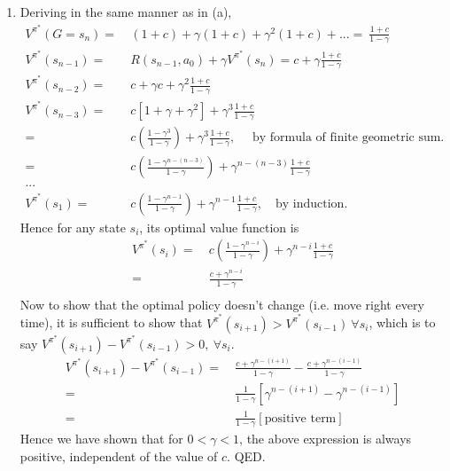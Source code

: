 \documentclass[11pt]{article}
\newcommand{\Vfunc}[2]{\ensuremath{V^{#1}(#2)}}
\begin{document}
\begin{enumerate}[label=(\alph*)]
	
	\item 
	Deriving in the same manner as in (a),
	\begin{align*}
	\Vfunc{\pi^*}{G=s_n}
	=&\ (1+c)+\gamma(1+c)+\gamma^2(1+c)+... =\ \frac{1+c}{1-\gamma} \\ 
	\Vfunc{\pi^*}{s_{n-1}}
	=&\ R(s_{n-1}, a_0) + \gamma \Vfunc{\pi^*}{s_n} = c + \gamma \frac{1+c}{1-\gamma} \\ 
	\Vfunc{\pi^*}{s_{n-2}}
	=&\ c + \gamma c + \gamma^2 \frac{1+c}{1-\gamma} \\
	\Vfunc{\pi^*}{s_{n-3}}
	=&\ c[1+\gamma+\gamma^2] + \gamma^3 \frac{1+c}{1-\gamma} \\
	=&\ c\left(\frac{1-\gamma^3}{1-\gamma}\right) + \gamma^3 \frac{1+c}{1-\gamma} , \quad \textrm{ by formula of finite geometric sum.} \\
	=&\ c\left(\frac{1-\gamma^{n-(n-3)}}{1-\gamma}\right) + \gamma^{n-(n-3)} \frac{1+c}{1-\gamma} \\ 
	... \\ 
	\Vfunc{\pi^*}{s_1} =&\ c(\frac{1-\gamma^{n-1}}{1-\gamma}) + \gamma^{n-1}\frac{1+c}{1-\gamma} , \quad \textrm{by induction.}
	\end{align*}
	Hence for any state $s_i$, its optimal value function is
	\begin{align*}
	\Vfunc{\pi^*}{s_i} =&\ c(\frac{1-\gamma^{n-i}}{1-\gamma}) + \gamma^{n-i}\frac{1+c}{1-\gamma} \\ 
	=&\ \frac{c+\gamma^{n-i}}{1-\gamma} \\ 
	\end{align*}
	Now to show that the optimal policy doesn't change (i.e. move right every time), it is sufficient to show that $\Vfunc{\pi^*}{s_{i+1}} > \Vfunc{\pi^*}{s_{i-1}} \ \forall s_i$, which is to say $\Vfunc{\pi^*}{s_{i+1}} - \Vfunc{\pi^*}{s_{i-1}} > 0 , \ \forall s_i$.
	\begin{align*}
	\Vfunc{\pi^*}{s_{i+1}} - \Vfunc{\pi^*}{s_{i-1}} =&\ \frac{c+\gamma^{n-(i+1)}}{1-\gamma} - \frac{c+\gamma^{n-(i-1)}}{1-\gamma} \\
	=&\ \frac{1}{1-\gamma}[\gamma^{n-(i+1)}-\gamma^{n-(i-1)}] \\
	=&\ \frac{1}{1-\gamma}[\textrm{positive term}]
	\end{align*}
	Hence we have shown that for $0<\gamma<1$, the above expression is always positive, independent of the value of $c$. QED.
	

\end{enumerate}
\end{document}
